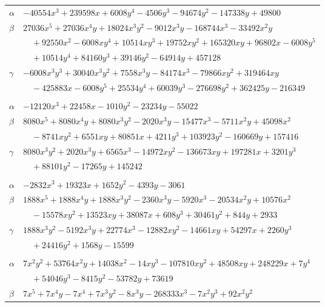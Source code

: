 \documentclass[11pt]{article}
\begin{document}
\begin{longtable}{@{}ll@{}}
$\alpha$ & $-40554x^{3}+239598x+6008y^{4}-4506y^{3}-94674y^{2}-147338y+49800$\\
$\beta$ & $27036x^{5}+27036x^{4}y+18024x^{3}y^{2}-9012x^{3}y-168744x^{3}-33492x^{2}y$\\
 & $\quad +92550x^{2}-6008xy^{4}+10514xy^{3}+19752xy^{2}+165320xy+96802x-6008y^{5}$\\
 & $\quad +10514y^{4}+84160y^{3}+39146y^{2}-64914y+457128$\\
$\gamma$ & $-6008x^{3}y^{3}+30040x^{3}y^{2}+7558x^{3}y-84174x^{3}-79866xy^{2}+319464xy$\\
 & $\quad -425883x-6008y^{5}+25534y^{4}+60039y^{3}-276698y^{2}+362425y-216349$\\
\addlinespace[3pt]
\multicolumn{2}{@{}l}{$\{i,j\}=\{62,137\}$, $k_{ij}=2^{3}\cdot 3^{3}\cdot 7^{2}\cdot 13$}\\
$\alpha$ & $-12120x^{3}+22458x-1010y^{2}-23234y-55022$\\
$\beta$ & $8080x^{5}+8080x^{4}y+8080x^{3}y^{2}-2020x^{3}y-15477x^{3}-5711x^{2}y+45098x^{2}$\\
 & $\quad -8741xy^{2}+6551xy+80851x+4211y^{3}+103923y^{2}-160669y+157416$\\
$\gamma$ & $8080x^{3}y^{2}+2020x^{3}y+6565x^{3}-14972xy^{2}-136673xy+197281x+3201y^{3}$\\
 & $\quad +88101y^{2}-17265y+145242$\\
\addlinespace[3pt]
\multicolumn{2}{@{}l}{$\{i,j\}=\{62,141\}$, $k_{ij}=2^{2}\cdot 3^{4}\cdot 7\cdot 11$}\\
$\alpha$ & $-2832x^{3}+19323x+1652y^{2}-4393y-3061$\\
$\beta$ & $1888x^{5}+1888x^{4}y+1888x^{3}y^{2}-2360x^{3}y-5920x^{3}-20534x^{2}y+10576x^{2}$\\
 & $\quad -15578xy^{2}+13523xy+38087x+608y^{3}+30461y^{2}+844y+2933$\\
$\gamma$ & $1888x^{3}y^{2}-5192x^{3}y+22774x^{3}-12882xy^{2}-14661xy+54297x+2260y^{3}$\\
 & $\quad +24416y^{2}+1568y-15599$\\
\addlinespace[3pt]
\multicolumn{2}{@{}l}{$\{i,j\}=\{62,159\}$, $k_{ij}=2^{4}\cdot 3^{4}\cdot 5\cdot 7\cdot 13$}\\
$\alpha$ & $7x^{2}y^{2}+53764x^{2}y+14038x^{2}-14xy^{3}-107810xy^{2}+48508xy+248229x+7y^{4}$\\
 & $\quad +54046y^{3}-8415y^{2}-53782y+73619$\\
$\beta$ & $7x^{5}+7x^{4}y-7x^{4}+7x^{3}y^{2}-8x^{3}y-268333x^{3}-7x^{2}y^{3}+92x^{2}y^{2}$\\

\end{longtable}
\end{document}
